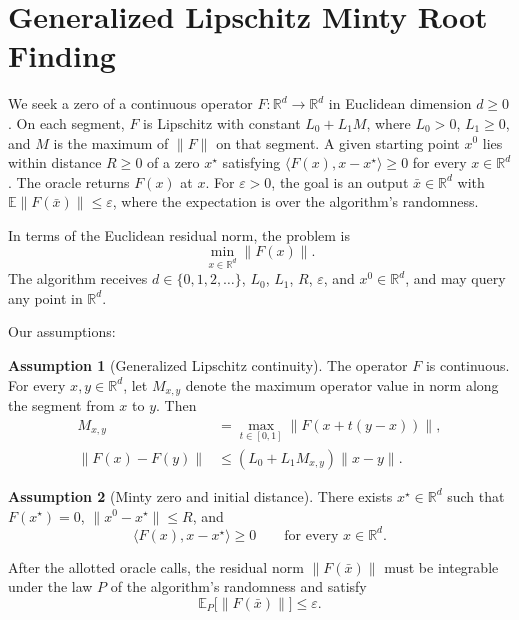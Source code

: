 \documentclass[10pt]{article}
\theoremstyle{definition}
\newtheorem{assumption}{Assumption}
\begin{document}
\section*{Generalized Lipschitz Minty Root Finding}
We seek a zero of a continuous operator $F:\mathbb{R}^d\to\mathbb{R}^d$ in Euclidean dimension $d\geq 0$. On each segment, $F$ is Lipschitz with constant $L_0+L_1 M$, where $L_0>0$, $L_1\geq 0$, and $M$ is the maximum of $\|F\|$ on that segment. A given starting point $x^0$ lies within distance $R\geq 0$ of a zero $x^\star$ satisfying $\langle F(x),x-x^\star\rangle\geq 0$ for every $x\in\mathbb{R}^d$. The oracle returns $F(x)$ at $x$. For $\varepsilon>0$, the goal is an output $\bar{x}\in\mathbb{R}^d$ with $\mathbb{E}\|F(\bar{x})\|\leq\varepsilon$, where the expectation is over the algorithm's randomness.

In terms of the Euclidean residual norm, the problem is
\[
\min_{x\in\mathbb{R}^d}\|F(x)\|.
\]
The algorithm receives $d\in\{0,1,2,\ldots\}$, $L_0$, $L_1$, $R$, $\varepsilon$, and $x^0\in\mathbb{R}^d$, and may query any point in $\mathbb{R}^d$.

Our assumptions:
\begin{assumption}[Generalized Lipschitz continuity]
The operator $F$ is continuous. For every $x,y\in\mathbb{R}^d$, let $M_{x,y}$ denote the maximum operator value in norm along the segment from $x$ to $y$. Then
\[
\begin{aligned}
M_{x,y} &= \max_{t\in[0,1]}\|F(x+t(y-x))\|,\\
\|F(x)-F(y)\| &\leq (L_0+L_1 M_{x,y})\|x-y\|.
\end{aligned}
\]
\end{assumption}

\begin{assumption}[Minty zero and initial distance]
There exists $x^\star\in\mathbb{R}^d$ such that $F(x^\star)=0$, $\|x^0-x^\star\|\leq R$, and
\[
\langle F(x),x-x^\star\rangle\geq 0
\qquad\text{for every }x\in\mathbb{R}^d.
\]
\end{assumption}

After the allotted oracle calls, the residual norm $\|F(\bar{x})\|$ must be integrable under the law $P$ of the algorithm's randomness and satisfy
\[
\mathbb{E}_{P}\bigl[\|F(\bar{x})\|\bigr]\leq\varepsilon.
\]
\end{document}
